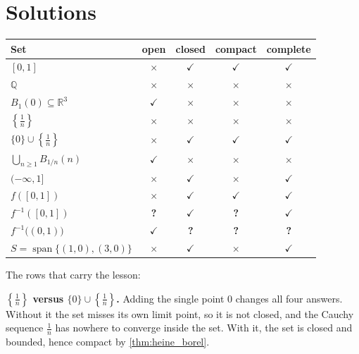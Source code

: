 
\section{Solutions}
\label{sec:compactness_solutions}

\begin{exercisesolution}
\label{sol:classification_table}
\begin{center}
\begin{tabular}{@{}l cccc@{}}
\textbf{Set} & \textbf{open} & \textbf{closed} & \textbf{compact} & \textbf{complete} \\
\hline
$[0,1]$ & $\times$ & $\checkmark$ & $\checkmark$ & $\checkmark$ \\
$\mathbb{Q}$ & $\times$ & $\times$ & $\times$ & $\times$ \\
$B_1(0) \subseteq \mathbb{R}^3$ & $\checkmark$ & $\times$ & $\times$ & $\times$ \\
$\left\{\tfrac1n\right\}$ & $\times$ & $\times$ & $\times$ & $\times$ \\
$\{0\}\cup\left\{\tfrac1n\right\}$ & $\times$ & $\checkmark$ & $\checkmark$ & $\checkmark$ \\
$\bigcup_{n\geq1}B_{1/n}(n)$ & $\checkmark$ & $\times$ & $\times$ & $\times$ \\
$(-\infty,1]$ & $\times$ & $\checkmark$ & $\times$ & $\checkmark$ \\
$f([0,1])$ & $\times$ & $\checkmark$ & $\checkmark$ & $\checkmark$ \\
$f^{-1}([0,1])$ & \textbf{?} & $\checkmark$ & \textbf{?} & $\checkmark$ \\
$f^{-1}\big((0,1)\big)$ & $\checkmark$ & \textbf{?} & \textbf{?} & \textbf{?} \\
$S = \operatorname{span}\{(1,0),(3,0)\}$ & $\times$ & $\checkmark$ & $\times$ & $\checkmark$ \\
\end{tabular}
\end{center}

The rows that carry the lesson:

\textbf{$\left\{\tfrac1n\right\}$ versus $\{0\}\cup\left\{\tfrac1n\right\}$.} Adding the single
point $0$ changes all four answers. Without it the set misses its own limit point, so it is not
closed, and the Cauchy sequence $\tfrac1n$ has nowhere to converge inside the set. With it, the
set is closed and bounded, hence compact by \cref{thm:heine_borel}.


\end{exercisesolution}

